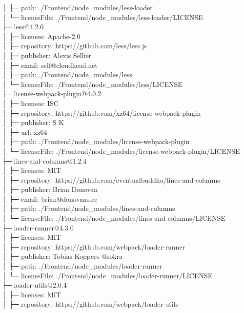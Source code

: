 │  ├─ path: ./Frontend/node\_modules/less-loader\\
│  └─ licenseFile: ./Frontend/node\_modules/less-loader/LICENSE\\
├─ less@4.2.0\\
│  ├─ licenses: Apache-2.0\\
│  ├─ repository: https://github.com/less/less.js\\
│  ├─ publisher: Alexis Sellier\\
│  ├─ email: self@cloudhead.net\\
│  ├─ path: ./Frontend/node\_modules/less\\
│  └─ licenseFile: ./Frontend/node\_modules/less/LICENSE\\
├─ license-webpack-plugin@4.0.2\\
│  ├─ licenses: ISC\\
│  ├─ repository: https://github.com/xz64/license-webpack-plugin\\
│  ├─ publisher: S K\\
│  ├─ url: xz64\\
│  ├─ path: ./Frontend/node\_modules/license-webpack-plugin\\
│  └─ licenseFile: ./Frontend/node\_modules/license-webpack-plugin/LICENSE\\
├─ lines-and-columns@1.2.4\\
│  ├─ licenses: MIT\\
│  ├─ repository: https://github.com/eventualbuddha/lines-and-columns\\
│  ├─ publisher: Brian Donovan\\
│  ├─ email: brian@donovans.cc\\
│  ├─ path: ./Frontend/node\_modules/lines-and-columns\\
│  └─ licenseFile: ./Frontend/node\_modules/lines-and-columns/LICENSE\\
├─ loader-runner@4.3.0\\
│  ├─ licenses: MIT\\
│  ├─ repository: https://github.com/webpack/loader-runner\\
│  ├─ publisher: Tobias Koppers @sokra\\
│  ├─ path: ./Frontend/node\_modules/loader-runner\\
│  └─ licenseFile: ./Frontend/node\_modules/loader-runner/LICENSE\\
├─ loader-utils@2.0.4\\
│  ├─ licenses: MIT\\
│  ├─ repository: https://github.com/webpack/loader-utils\\
